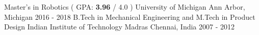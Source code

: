 

\begin{cventries}
  \cventry
  {Master's in Robotics ( GPA: {\small \textbf{3.96} / 4.0} ) } %
  {University of Michigan} %
  {Ann Arbor, Michigan} %
  {2016 - 2018} %
  {
  }
\vspace{-0.3cm}
  \cventry
  {B.Tech in Mechanical Engineering and M.Tech in Product Design} %
  {Indian Institute of Technology Madras} %
  {Chennai, India} %
  {2007 - 2012} %
  {
  }
\vspace{-0.7cm}
\end{cventries}
